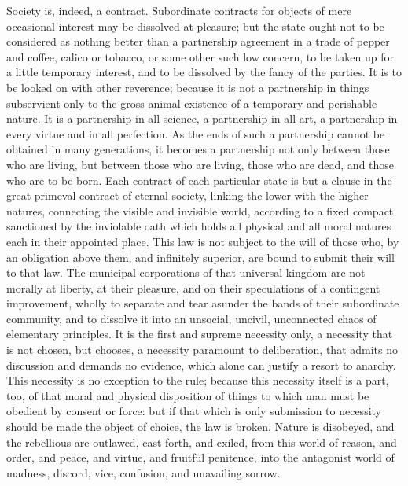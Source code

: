 Society is, indeed, a contract. Subordinate contracts for objects of mere occasional interest may be dissolved at pleasure; but the state ought not to be considered as nothing better than a partnership agreement in a trade of pepper and coffee, calico or tobacco, or some other such low concern, to be taken up for a little temporary interest, and to be dissolved by the fancy of the parties. It is to be looked on with other reverence; because it is not a partnership in things subservient only to the gross animal existence of a temporary and perishable nature. It is a partnership in all science, a partnership in all art, a partnership in every virtue and in all perfection. As the ends of such a partnership cannot be obtained in many generations, it becomes a partnership not only between those who are living, but between those who are living, those who are dead, and those who are to be born. Each contract of each particular state is but a clause in the great primeval contract of eternal society, linking the lower with the higher natures, connecting the visible and invisible world, according to a fixed compact sanctioned by the inviolable oath which holds all physical and all moral natures each in their appointed place. This law is not subject to the will of those who, by an obligation above them, and infinitely superior, are bound to submit their will to that law. The municipal corporations of that universal kingdom are not morally at liberty, at their pleasure, and on their speculations of a contingent improvement, wholly to separate and tear asunder the bands of their subordinate community, and to dissolve it into an unsocial, uncivil, unconnected chaos of elementary principles. It is the first and supreme necessity only, a necessity that is not chosen, but chooses, a necessity paramount to deliberation, that admits no discussion and demands no evidence, which alone can justify a resort to anarchy. This necessity is no exception to the rule; because this necessity itself is a part, too, of that moral and physical disposition of things to which man must be obedient by consent or force: but if that which is only submission to necessity should be made the object of choice, the law is broken, Nature is disobeyed, and the rebellious are outlawed, cast forth, and exiled, from this world of reason, and order, and peace, and virtue, and fruitful penitence, into the antagonist world of madness, discord, vice, confusion, and unavailing sorrow.

